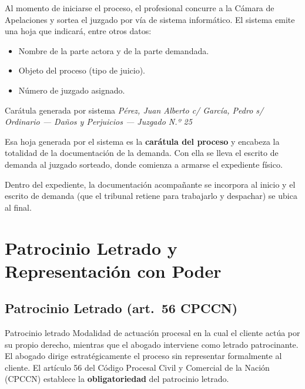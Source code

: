 \documentclass[12pt,oneside]{book}
\begin{document}
Al momento de iniciarse el proceso, el profesional concurre a la Cámara de Apelaciones y sortea el juzgado por vía de sistema informático. El sistema emite una hoja que indicará, entre otros datos:

\begin{itemize}
    \item Nombre de la parte actora y de la parte demandada.
    \item Objeto del proceso (tipo de juicio).
    \item Número de juzgado asignado.
\end{itemize}

\begin{example}{Carátula generada por sistema}
\textit{Pérez, Juan Alberto c/ García, Pedro s/ Ordinario --- Daños y Perjuicios --- Juzgado N.º 25}
\end{example}

Esa hoja generada por el sistema es la \textbf{carátula del proceso} y encabeza la totalidad de la documentación de la demanda. Con ella se lleva el escrito de demanda al juzgado sorteado, donde comienza a armarse el expediente físico.

\begin{note}
Dentro del expediente, la documentación acompañante se incorpora al inicio y el escrito de demanda (que el tribunal retiene para trabajarlo y despachar) se ubica al final.
\end{note}

\chapter{Patrocinio Letrado y Representación con Poder}

\section{Patrocinio Letrado (art.\ 56 CPCCN)}

\begin{definition}{Patrocinio letrado}
Modalidad de actuación procesal en la cual el cliente actúa por su propio derecho, mientras que el abogado interviene como letrado patrocinante. El abogado dirige estratégicamente el proceso sin representar formalmente al cliente. El artículo 56 del Código Procesal Civil y Comercial de la Nación (CPCCN) establece la \textbf{obligatoriedad} del patrocinio letrado.
\end{definition}
\end{document}
